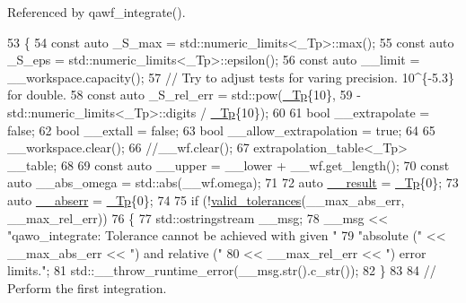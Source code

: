 Referenced by qawf\+\_\+integrate().


\begin{DoxyCode}
53     \{
54       \textcolor{keyword}{const} \textcolor{keyword}{auto} \_S\_max = std::numeric\_limits<\_Tp>::max();
55       \textcolor{keyword}{const} \textcolor{keyword}{auto} \_S\_eps = std::numeric\_limits<\_Tp>::epsilon();
56       \textcolor{keyword}{const} \textcolor{keyword}{auto} \_\_limit = \_\_workspace.capacity();
57       \textcolor{comment}{// Try to adjust tests for varing precision. 10^\{-5.3\} for double.}
58       \textcolor{keyword}{const} \textcolor{keyword}{auto} \_S\_rel\_err = std::pow(\hyperlink{namespace____gnu__cxx_a3b19a9c800ca194374ef9172290f7d79}{\_Tp}\{10\},
59                                  -std::numeric\_limits<\_Tp>::digits / \hyperlink{namespace____gnu__cxx_a3b19a9c800ca194374ef9172290f7d79}{\_Tp}\{10\});
60 
61       \textcolor{keywordtype}{bool} \_\_extrapolate = \textcolor{keyword}{false};
62       \textcolor{keywordtype}{bool} \_\_extall = \textcolor{keyword}{false};
63       \textcolor{keywordtype}{bool} \_\_allow\_extrapolation = \textcolor{keyword}{true};
64 
65       \_\_workspace.clear();
66       \textcolor{comment}{//\_\_wf.clear();}
67       extrapolation\_table<\_Tp> \_\_table;
68 
69       \textcolor{keyword}{const} \textcolor{keyword}{auto} \_\_upper = \_\_lower + \_\_wf.get\_length();
70       \textcolor{keyword}{const} \textcolor{keyword}{auto} \_\_abs\_omega = std::abs(\_\_wf.omega);
71 
72       \textcolor{keyword}{auto} \hyperlink{namespace____gnu__cxx_a500ea9f53aeaecd8c2ae657503450578}{\_\_result} = \hyperlink{namespace____gnu__cxx_a3b19a9c800ca194374ef9172290f7d79}{\_Tp}\{0\};
73       \textcolor{keyword}{auto} \hyperlink{namespace____gnu__cxx_a72f736cff127f1574e91a301de9e074b}{\_\_abserr} = \hyperlink{namespace____gnu__cxx_a3b19a9c800ca194374ef9172290f7d79}{\_Tp}\{0\};
74 
75       \textcolor{keywordflow}{if} (!\hyperlink{namespace____gnu__cxx_a86b1d89b2e2cb97614fdf3425d3dccd5}{valid\_tolerances}(\_\_max\_abs\_err, \_\_max\_rel\_err))
76         \{
77           std::ostringstream \_\_msg;
78           \_\_msg << \textcolor{stringliteral}{"qawo\_integrate: Tolerance cannot be achieved with given "}
79                    \textcolor{stringliteral}{"absolute ("} << \_\_max\_abs\_err << \textcolor{stringliteral}{") and relative ("}
80                 << \_\_max\_rel\_err << \textcolor{stringliteral}{") error limits."};
81           std::\_\_throw\_runtime\_error(\_\_msg.str().c\_str());
82         \}
83 
84       \textcolor{comment}{// Perform the first integration.}

\end{DoxyCode}
